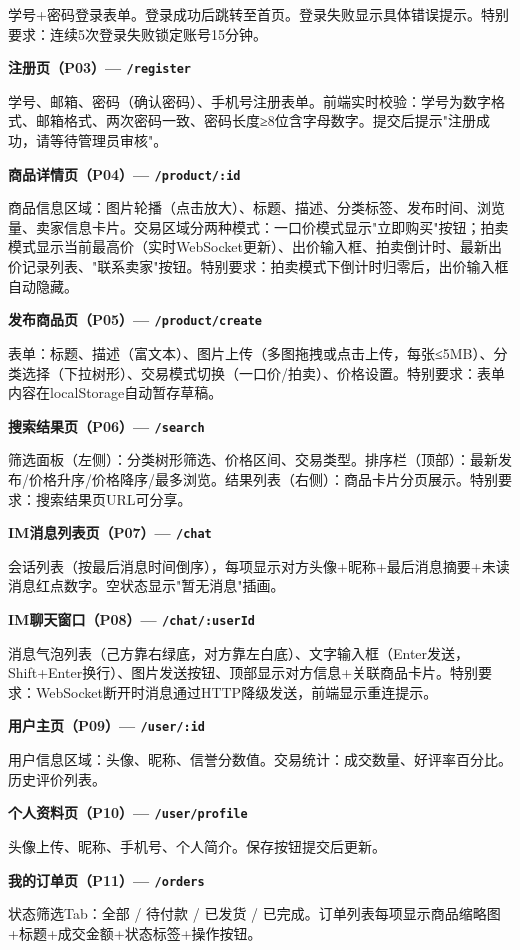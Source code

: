 \documentclass[12pt,a4paper]{ctexart}
\numberwithin{figure}{section}
\numberwithin{table}{section}
\begin{document}
学号+密码登录表单。登录成功后跳转至首页。登录失败显示具体错误提示。特别要求：连续5次登录失败锁定账号15分钟。

\textbf{注册页（P03）--- \texttt{/register}}

学号、邮箱、密码（确认密码）、手机号注册表单。前端实时校验：学号为数字格式、邮箱格式、两次密码一致、密码长度≥8位含字母数字。提交后提示"注册成功，请等待管理员审核"。

\textbf{商品详情页（P04）--- \texttt{/product/:id}}

商品信息区域：图片轮播（点击放大）、标题、描述、分类标签、发布时间、浏览量、卖家信息卡片。交易区域分两种模式：一口价模式显示"立即购买"按钮；拍卖模式显示当前最高价（实时WebSocket更新）、出价输入框、拍卖倒计时、最新出价记录列表、"联系卖家"按钮。特别要求：拍卖模式下倒计时归零后，出价输入框自动隐藏。

\textbf{发布商品页（P05）--- \texttt{/product/create}}

表单：标题、描述（富文本）、图片上传（多图拖拽或点击上传，每张≤5MB）、分类选择（下拉树形）、交易模式切换（一口价/拍卖）、价格设置。特别要求：表单内容在localStorage自动暂存草稿。

\textbf{搜索结果页（P06）--- \texttt{/search}}

筛选面板（左侧）：分类树形筛选、价格区间、交易类型。排序栏（顶部）：最新发布/价格升序/价格降序/最多浏览。结果列表（右侧）：商品卡片分页展示。特别要求：搜索结果页URL可分享。

\textbf{IM消息列表页（P07）--- \texttt{/chat}}

会话列表（按最后消息时间倒序），每项显示对方头像+昵称+最后消息摘要+未读消息红点数字。空状态显示"暂无消息"插画。

\textbf{IM聊天窗口（P08）--- \texttt{/chat/:userId}}

消息气泡列表（己方靠右绿底，对方靠左白底）、文字输入框（Enter发送，Shift+Enter换行）、图片发送按钮、顶部显示对方信息+关联商品卡片。特别要求：WebSocket断开时消息通过HTTP降级发送，前端显示重连提示。

\textbf{用户主页（P09）--- \texttt{/user/:id}}

用户信息区域：头像、昵称、信誉分数值。交易统计：成交数量、好评率百分比。历史评价列表。

\textbf{个人资料页（P10）--- \texttt{/user/profile}}

头像上传、昵称、手机号、个人简介。保存按钮提交后更新。

\textbf{我的订单页（P11）--- \texttt{/orders}}

状态筛选Tab：全部 / 待付款 / 已发货 / 已完成。订单列表每项显示商品缩略图+标题+成交金额+状态标签+操作按钮。
\end{document}
